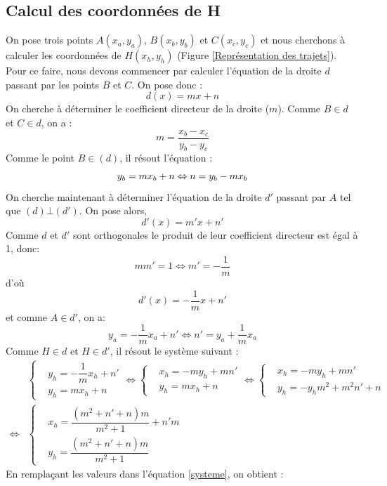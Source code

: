 \subsection{Calcul des coordonnées de H}
On pose trois points $ A(x_a,y_a) $, $ B(x_b,y_b) $ et $ C(x_c,y_c) $ et nous cherchons à calculer les coordonnées de $ H(x_h,y_h) $ (Figure \ref{Représentation des trajets}).
Pour ce faire, nous devons commencer par calculer l'équation de la droite $ d $ passant par les points $B$ et $C$.
On pose donc : 
\[
 	d(x) = mx + n
\]
On cherche à déterminer le coefficient directeur de la droite ($m$). Comme $B \in d$ et $C \in d$, on a :
\[
   m =  \frac{x_b-x_c}{y_b-y_c}
\]
Comme le point $B \in (d)$, il résout l'équation :
\[
   y_b = mx_b + n \\
   \Leftrightarrow n = y_b - mx_b
\]
On cherche maintenant à déterminer l'équation de la droite $ d' $ passant par $ A $ tel que $ (d)\bot (d') $. On pose alors, 
\[
 	d'(x) = m'x + n'
\]
Comme $d$ et $d'$ sont orthogonales le produit de leur coefficient directeur est égal à 1, donc:
\[
	mm' = 1 \Leftrightarrow m' = -\frac{1}{m}	
\]
d'où
\[
	d'(x) = -\frac{1}{m}x+n'
\]
et comme $ A \in d' $, on a:
\[
	y_a = -\frac{1}{m}x_a + n' \Leftrightarrow n' = y_a + \frac{1}{m}x_a
\]
Comme $ H \in d$ et $H \in d'$, il résout le système suivant :
\begin{align}
    &\begin{cases}
   		 & y_h = -\dfrac{1}{m}x_h + n'\\
   		 & y_h = mx_h + n
    \end{cases} 
    \Leftrightarrow
    \begin{cases}
   		& x_h = -my_h + mn'\\
    	& y_h = mx_h + n
    \end{cases} 
    \Leftrightarrow
    \begin{cases}
   		& x_h = -my_h + mn'\\
    	& y_h = -y_hm^2 + m^2n' + n
    \end{cases} \\
    \Leftrightarrow
    \label{systeme}
    &\begin{cases}
   		& x_h = \dfrac{(m^2+n'+n)m}{m^2+1} + n'm \\
    	& y_h = \dfrac{(m^2+n'+n)m}{m^2+1}
    \end{cases}
\end{align}
En remplaçant les valeurs dans l'équation \eqref{systeme}, on obtient :

